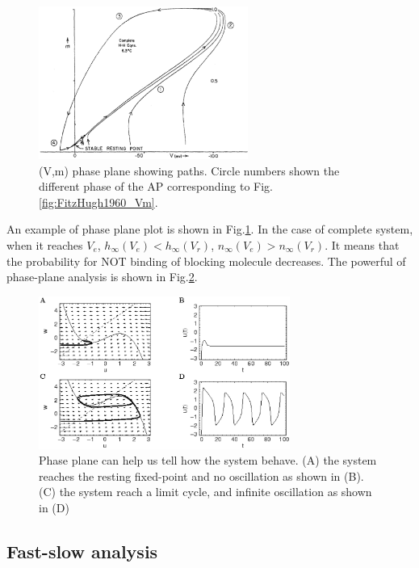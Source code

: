 \begin{figure}[hbt]
  \centerline{\includegraphics[height=5cm,
    angle=0]{./images/FitzHughFig9_phaseplane.eps}}
  \caption{(V,m) phase plane showing paths. Circle numbers shown the different
  phase of the AP corresponding to Fig.\ref{fig:FitzHugh1960_Vm}.}
  \label{fig:FN_phaseplane}
\end{figure}

An example of phase plane plot is shown in Fig.\ref{fig:FN_phaseplane}. In the
case of complete system, when it reaches $V_e$, $h_\infty(V_e)<h_\infty(V_r)$,
$n_\infty(V_e)>n_\infty (V_r)$. It means that the probability for NOT binding of
blocking molecule decreases. The powerful of phase-plane analysis is shown in
Fig.\ref{fig:FN_phaseplane2}.


\begin{figure}[hbt]
  \centerline{\includegraphics[height=5cm,
    angle=0]{./images/FitzHugh-phaseplane.eps}}
  \caption{Phase plane can help us tell how the system behave. (A) the system
  reaches the resting fixed-point and no oscillation as shown in (B). (C) the
  system reach a limit cycle, and infinite oscillation as shown in (D)}
  \label{fig:FN_phaseplane2}
\end{figure}

\subsection{Fast-slow analysis}

